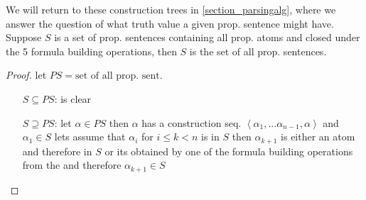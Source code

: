 We will return to these construction trees in \ref{section_parsingalg}, where we answer the question of what 
truth value a given prop. sentence might have.
\newpage
{}
\noindent{} Suppose $S$ is a set of prop. sentences
containing all prop. atoms and closed under the 5 formula building operations, 
then $S$ is the set of all prop. sentences.
\begin{proof}
    let $PS = \text{set of all prop. sent.}$
    \begin{itemize}[leftmargin=2cm]
        \item[$S\subseteq PS$:] is clear
        \item[$S\supseteq PS$:] let $\alpha\in PS$ then $\alpha$ has a construction seq. $\left\langle \alpha_1,\dots \alpha_{n-1},\alpha\right\rangle$ and $\alpha_1\in S$
        lets assume that $\alpha_i$ for $i\leq k<n$ is in $S$ then $\alpha_{k+1}$ is either an atom and therefore in $S$ or its obtained by one of the formula building operations 
        from the 
        and therefore $\alpha_{k+1}\in S$
    \end{itemize}
\end{proof}
